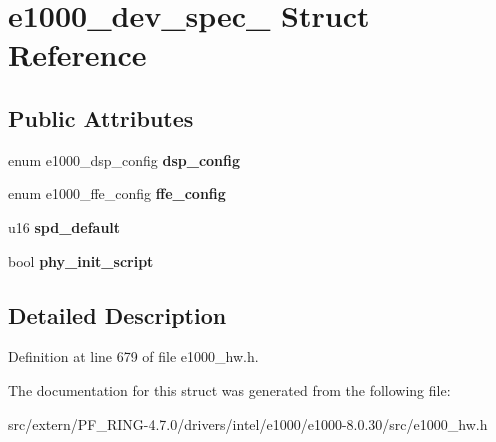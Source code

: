 \hypertarget{structe1000__dev__spec__82541}{
\section{e1000\_\-dev\_\-spec\_ Struct Reference}
\label{structe1000__dev__spec__82541}
}
\subsection*{Public Attributes}
\begin{DoxyCompactItemize}
\item 
\hypertarget{structe1000__dev__spec__82541_ac26cc458aa89e6a561a9e46337e60a6e}{
enum e1000\_\-dsp\_\-config {\bfseries dsp\_\-config}}
\label{structe1000__dev__spec__82541_ac26cc458aa89e6a561a9e46337e60a6e}

\item 
\hypertarget{structe1000__dev__spec__82541_aa4bcbf5ebd432a984df0f7209d540f91}{
enum e1000\_\-ffe\_\-config {\bfseries ffe\_\-config}}
\label{structe1000__dev__spec__82541_aa4bcbf5ebd432a984df0f7209d540f91}

\item 
\hypertarget{structe1000__dev__spec__82541_ab4e61772b65e64e782abf25f629c709e}{
u16 {\bfseries spd\_\-default}}
\label{structe1000__dev__spec__82541_ab4e61772b65e64e782abf25f629c709e}

\item 
\hypertarget{structe1000__dev__spec__82541_af6b1ab4559f36937fcf2eea699bcfbd0}{
bool {\bfseries phy\_\-init\_\-script}}
\label{structe1000__dev__spec__82541_af6b1ab4559f36937fcf2eea699bcfbd0}

\end{DoxyCompactItemize}


\subsection{Detailed Description}


Definition at line 679 of file e1000\_\-hw.h.



The documentation for this struct was generated from the following file:\begin{DoxyCompactItemize}
\item 
src/extern/PF\_\-RING-\/4.7.0/drivers/intel/e1000/e1000-\/8.0.30/src/e1000\_\-hw.h\end{DoxyCompactItemize}
